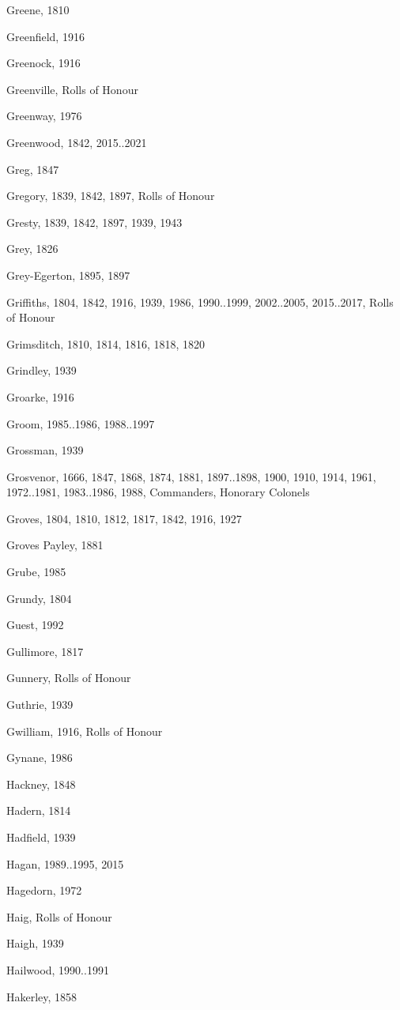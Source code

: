 \begin{theindex}
\item Greene, 1810
\item Greenfield, 1916
\item Greenock, 1916
\item Greenville, Rolls of Honour
\item Greenway, 1976
\item Greenwood, 1842, 2015..2021
\item Greg, 1847
\item Gregory, 1839, 1842, 1897, Rolls of Honour
\item Gresty, 1839, 1842, 1897, 1939, 1943
\item Grey, 1826
\item Grey-Egerton, 1895, 1897
\item Griffiths, 1804, 1842, 1916, 1939, 1986, 1990..1999, 2002..2005, 2015..2017, Rolls of Honour
\item Grimsditch, 1810, 1814, 1816, 1818, 1820
\item Grindley, 1939
\item Groarke, 1916
\item Groom, 1985..1986, 1988..1997
\item Grossman, 1939
\item Grosvenor, 1666, 1847, 1868, 1874, 1881, 1897..1898, 1900, 1910, 1914, 1961, 1972..1981, 1983..1986, 1988, Commanders, Honorary Colonels
\item Groves, 1804, 1810, 1812, 1817, 1842, 1916, 1927
\item Groves Payley, 1881
\item Grube, 1985
\item Grundy, 1804
\item Guest, 1992
\item Gullimore, 1817
\item Gunnery, Rolls of Honour
\item Guthrie, 1939
\item Gwilliam, 1916, Rolls of Honour
\item Gynane, 1986
\item Hackney, 1848
\item Hadern, 1814
\item Hadfield, 1939
\item Hagan, 1989..1995, 2015
\item Hagedorn, 1972
\item Haig, Rolls of Honour
\item Haigh, 1939
\item Hailwood, 1990..1991
\item Hakerley, 1858

\end{theindex}
